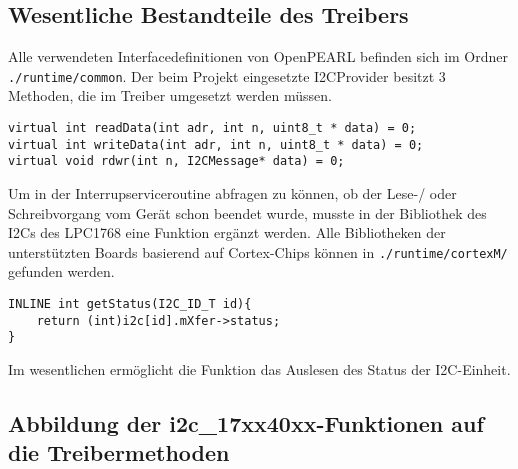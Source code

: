 \documentclass[12pt,a4paper]{article}
\begin{document}
\subsection{Wesentliche Bestandteile des Treibers}
Alle verwendeten Interfacedefinitionen von OpenPEARL befinden sich im Ordner \verb+./runtime/common+.
Der beim Projekt eingesetzte I2CProvider besitzt 3 Methoden, die im Treiber umgesetzt werden müssen.
\begin{verbatim}
virtual int readData(int adr, int n, uint8_t * data) = 0;
virtual int writeData(int adr, int n, uint8_t * data) = 0;
virtual void rdwr(int n, I2CMessage* data) = 0;
\end{verbatim}
Um in der Interrupserviceroutine abfragen zu können, ob der Lese-/ oder Schreibvorgang vom Gerät schon beendet wurde, musste in der Bibliothek des I2Cs des LPC1768 eine Funktion ergänzt werden. Alle Bibliotheken der unterstützten Boards basierend auf Cortex-Chips können in \verb+./runtime/cortexM/+ gefunden werden.
\begin{verbatim}
INLINE int getStatus(I2C_ID_T id){
	return (int)i2c[id].mXfer->status;
}
\end{verbatim}
Im wesentlichen ermöglicht die Funktion das Auslesen des Status der I2C-Einheit. 

\subsection{Abbildung der i2c\_17xx40xx-Funktionen auf die Treibermethoden}
\end{document}
